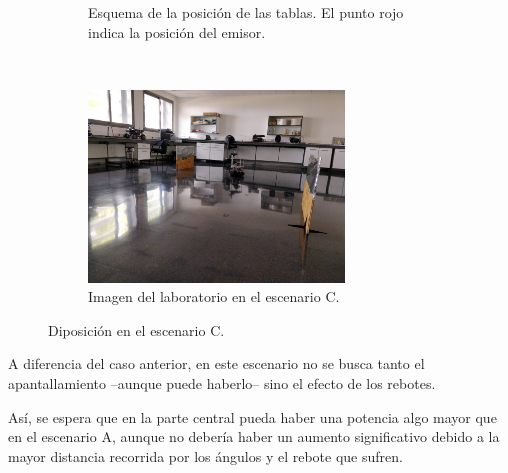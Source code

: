 \begin{figure}[H]
    \centering
    \begin{subfigure}[b]{0.45\textwidth}
        \centering
        
        \caption{Esquema de la posición de las tablas. El punto rojo indica la posición del emisor.}
    \end{subfigure}
    ~~
    \begin{subfigure}[b]{0.45\textwidth}
        \centering
        \includegraphics[width=6.8cm]{pic/escC.jpg}
        \caption{Imagen del laboratorio en el escenario C.}
    \end{subfigure}
    \caption{Diposición en el escenario C.}
    \label{fig:escenarioC}
\end{figure}

A diferencia del caso anterior, en este escenario no se busca tanto el apantallamiento --aunque puede haberlo-- sino el efecto de los rebotes.

Así, se espera que en la parte central pueda haber una potencia algo mayor que en el escenario A, aunque no debería haber un aumento significativo debido a la mayor distancia recorrida por los ángulos y el rebote que sufren.

